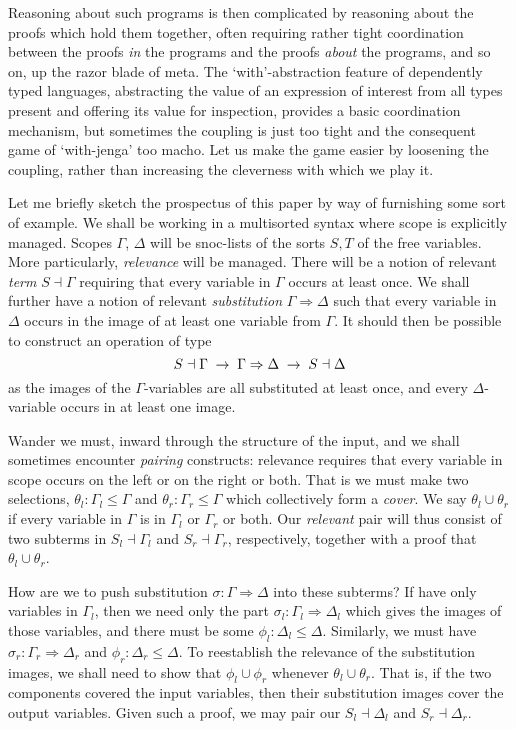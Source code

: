 \documentclass[orivec]{jfp}
\renewcommand{\to}{\mathrel{\blue{\rightarrow}}}
\begin{document}
Reasoning about such programs is then complicated by reasoning about the proofs which hold them together, often requiring rather tight coordination between the proofs \emph{in} the programs and the proofs \emph{about} the programs, and so on, up the razor blade of meta. The `with'-abstraction feature of dependently typed languages, abstracting the value of an expression of interest from all types present and offering its value for inspection, provides a basic coordination mechanism, but sometimes the coupling is just too tight and the consequent game of `with-jenga' too macho. Let us make the game easier by loosening the coupling, rather than increasing the cleverness with which we play it.

\newcommand{\thin}{\le}
\newcommand{\sbst}{\Rightarrow}
\newcommand{\term}{\dashv}
\newcommand{\cover}{\cup}

Let me briefly sketch the prospectus of this paper by way of furnishing some sort of example. We shall be working in a multisorted syntax where scope is explicitly managed. Scopes $\Gamma$, $\Delta$ will be snoc-lists of the sorts $S, T$ of the free variables. More particularly, \emph{relevance} will be managed. There will be a notion of relevant \emph{term} $S\term\Gamma$ requiring that every variable in $\Gamma$ occurs at least once. We shall further have a notion of relevant \emph{substitution} $\Gamma\sbst\Delta$ such that every variable in $\Delta$ occurs in the image of at least one variable from $\Gamma$. It should then be possible to construct an operation of type
\[
S\term\Gamma \;\to\; \Gamma\sbst\Delta \;\to\; S\term\Delta
\]
as the images of the $\Gamma$-variables are all substituted at least once, and every $\Delta$-variable occurs in at least one image.

Wander we must, inward through the structure of the input, and we shall sometimes encounter \emph{pairing} constructs: relevance requires that every variable in scope occurs on the left or on the right or both. That is we must make two selections, $\theta_l : \Gamma_l\thin\Gamma$ and $\theta_r : \Gamma_r\thin\Gamma$ which collectively form a \emph{cover}. We say $\theta_l\cover\theta_r$ if every variable in $\Gamma$ is in $\Gamma_l$ or $\Gamma_r$ or both. Our \emph{relevant} pair will thus consist of two subterms in $S_l\term\Gamma_l$ and $S_r\term\Gamma_r$, respectively, together with a proof that $\theta_l\cover\theta_r$.

How are we to push substitution $\sigma:\Gamma\sbst\Delta$ into these subterms? If have only variables in $\Gamma_l$, then we need only the part $\sigma_l : \Gamma_l\sbst\Delta_l$ which gives the images of those variables, and there must be some $\phi_l : \Delta_l\thin\Delta$. Similarly, we must have $\sigma_r : \Gamma_r\sbst\Delta_r$ and $\phi_r:\Delta_r\thin\Delta$. To reestablish the relevance of the substitution images, we shall need to show that $\phi_l\cover\phi_r$ whenever $\theta_l\cover\theta_r$. That is, if the two components covered the input variables, then their substitution images cover the output variables. Given such a proof, we may pair our $S_l\term\Delta_l$ and $S_r\term\Delta_r$.
\end{document}
